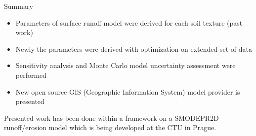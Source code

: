 \begin{alertblock}{Summary}
    {\large
    \begin{itemize}
        \item Parameters of surface runoff model were derived for each soil texture (past work)
        \item Newly the parameters were derived with optimization on extended set of data
        \item Sensitivity analysis and Monte Carlo model uncertainty assessment were performed
        \item New open source GIS (Geographic Information System) model provider is presented
    \end{itemize}
    }
\end{alertblock}\vspace{0.9cm}





\justifying
{\rmfamily
Presented work has been done within a framework on a SMODEPR2D runoff/erosion model which is being developed at the CTU in Prague.
}
